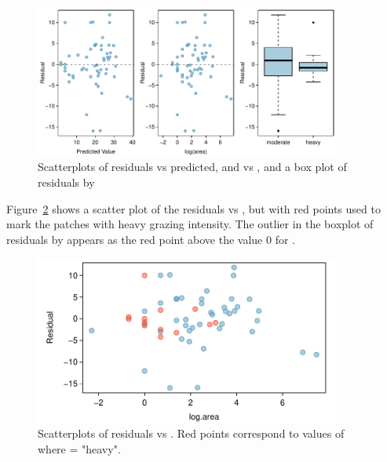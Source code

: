  \begin{figure}[h!]
 	\centering
 	\includegraphics[width=0.9\textwidth]
{ch_multiple_linear_regression_oi_biostat/figures/forestbirdsAbunLogAreaGrazingResidPlots/forestbirdsAbunLogAreaGrazingResidPlots.pdf}
     \caption{Scatterplots of residuals vs predicted, and vs , and a box plot of residuals by }
    	\label{forestbirdsAbunLogAreaGrazingResidPlots}
 \end{figure}
 
Figure~\ref{forestbirdsResidLogAreaScatterPlot} shows a scatter plot of the residuals vs , but with red points used to mark the patches with heavy grazing intensity.  The outlier in the boxplot of residuals by  appears as the red point above the value 0 for .

 \begin{figure}[h!]
 	\centering
 	\includegraphics[width=0.9\textwidth]
{ch_multiple_linear_regression_oi_biostat/figures/forestbirdsResidLogAreaScatterPlot/forestbirdsResidLogAreaScatterPlot.pdf}
     \caption{Scatterplots of residuals vs . Red points correspond to values of  where  = "heavy".}
    	\label{forestbirdsResidLogAreaScatterPlot}
 \end{figure}
 
